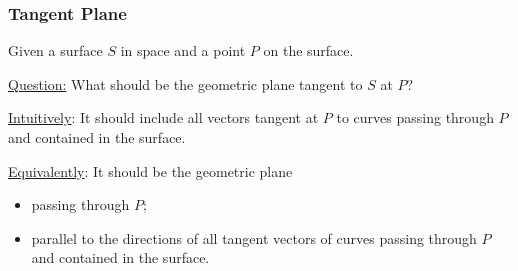 \begin{frame}
  \frametitle{Tangent Plane}

Given a surface $S$ in space and a point $P$ on the surface.

\bigskip

\underline{Question:} What should be the geometric plane tangent to $S$ at $P$?

\pause
\bigskip

\underline{Intuitively}: It should include all vectors tangent at $P$ to curves passing through $P$ and contained in the surface.

\bigskip

\underline{Equivalently}: It should be the geometric plane
\begin{itemize}
  \item passing through $P$;
  \item parallel to the directions of all tangent vectors of curves passing through $P$ and contained in the surface.
\end{itemize}

\end{frame}